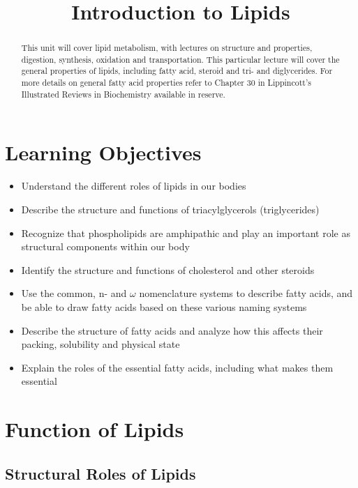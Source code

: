 \documentclass{tufte-handout}
\title{Introduction to Lipids}
\author{}
\date{}  %
\begin{document}
\maketitle%

\begin{abstract}
\noindent This unit will cover lipid metabolism, with lectures on structure and properties, digestion, synthesis, oxidation and transportation.  This particular lecture will cover the general properties of lipids, including fatty acid, steroid and tri- and diglycerides.  For more details on general fatty acid properties refer to Chapter 30 in Lippincott's Illustrated Reviews in Biochemistry available in reserve\cite{Ferrier2017}.
\end{abstract}

\tableofcontents

\pagebreak
\section{Learning Objectives}

\begin{itemize}
\item Understand the different roles of lipids in our bodies
\item Describe the structure and functions of triacylglycerols (triglycerides)
\item Recognize that phospholipids are amphipathic and play an important role as structural components within our body
\item Identify the structure and functions of cholesterol and other steroids
\item Use the common, n- and $\omega$ nomenclature systems to describe fatty acids, and be able to draw fatty acids based on these various naming systems
\item Describe the structure of fatty acids and analyze how this affects their packing, solubility and physical state
\item Explain the roles of the essential fatty acids, including what makes them essential

\end{itemize}

\section{Function of Lipids}

\subsection{Structural Roles of Lipids}
\end{document}

